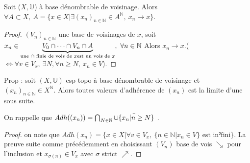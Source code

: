 \begin{proposition}
    Soit ($X,\mathbb{U}$) à base dénombrable de voisinage. Alors $\forall A\subset X,\ \overline{A}=\{x\in X|\exists (x_{n})_{n\in \mathbb{N} }\in A^\mathbb{N},\ x_{n}\to x\} $.
\end{proposition}
\begin{proof}
$(V_n)_{n\in \mathbb{N} }$ une base de voisinages de $x$, soit $x_{n}\in \underbrace{V_0\cap \cdots\cap V_n\cap A}_{\text{une $\cap $ finie de vois de $x$\\est un vois de $x$}},\ \forall n \in \mathbb{N}$ Alors $x_{n}\to x$.($\Leftrightarrow \forall v\in V_x,\ \exists N, \forall n\ge N, \ x_{n}\in V$).
\end{proof}
\begin{proposition}
    Prop : soit $(X,\mathbb{U})$ esp topo à base dénombrable de voisinage et $(x_{n})_{n\in \mathbb{N} }\in X^\mathbb{N} $. Alors toutes valeurs d'adhérence de $(x_{n})$ est la limite d'une sous suite.
\end{proposition}
On rappelle que $Adh((x_{n}))= \bigcap_{N\in \mathbb{N} }\Bar{\cup \{x_{n}|n\ge N\}}$ .
\begin{proof}
     on note que $Adh(x_{n})=\{x\in X|\forall v\in V_x,\ \{n\in \mathbb{N} |x_{n}\in V\} \text{ est in²fini} \}$. La preuve suite comme précédemment en choisissant $(V_n)$ base de vois $\searrow$ pour l'inclusion et $x_{\sigma(n)}\in V_x$ avec $\sigma$ strict $\nearrow$.
\end{proof}

